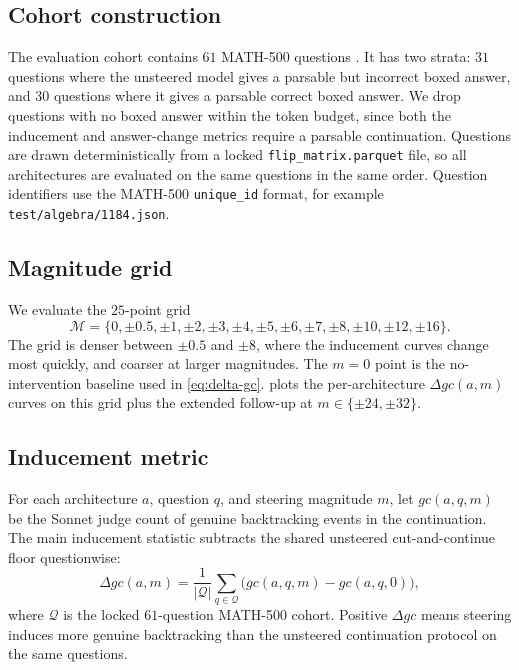 \subsection{Cohort construction}
\label{app:c7-cohort}

The evaluation cohort contains $61$ MATH-500 questions \cite{hendrycks2021math}. It has two strata: $31$ questions where the unsteered model gives a parsable but incorrect boxed answer, and $30$ questions where it gives a parsable correct boxed answer. We drop questions with no boxed answer within the token budget, since both the inducement and answer-change metrics require a parsable continuation. Questions are drawn deterministically from a locked \texttt{flip\_matrix.parquet} file, so all architectures are evaluated on the same questions in the same order. Question identifiers use the MATH-500 \texttt{unique\_id} format, for example \texttt{test/algebra/1184.json}.

\subsection{Magnitude grid}
\label{app:c7-grid}

We evaluate the $25$-point grid
\[
    \mathcal{M} = \{0, \pm0.5, \pm1, \pm2, \pm3, \pm4, \pm5, \pm6, \pm7, \pm8, \pm10, \pm12, \pm16\}.
\]
The grid is denser between $\pm0.5$ and $\pm8$, where the inducement curves change most quickly, and coarser at larger magnitudes. The $m=0$ point is the no-intervention baseline used in \cref{eq:delta-gc}.  plots the per-architecture $\Delta gc(a, m)$ curves on this grid plus the extended follow-up at $m \in \{\pm24, \pm32\}$.

\subsection{Inducement metric}
\label{app:c7-delta-gc}

For each architecture $a$, question $q$, and steering magnitude $m$, let
$gc(a,q,m)$ be the Sonnet judge count of genuine backtracking events in the
continuation. The main inducement statistic subtracts the shared unsteered
cut-and-continue floor questionwise:
\[
    \Delta gc(a,m)
    =
    \frac{1}{|\mathcal Q|}
    \sum_{q\in\mathcal Q}
    \bigl(gc(a,q,m)-gc(a,q,0)\bigr),
    \label{eq:delta-gc}
\]
where $\mathcal Q$ is the locked $61$-question MATH-500 cohort. Positive
$\Delta gc$ means steering induces more genuine backtracking than the unsteered
continuation protocol on the same questions.

